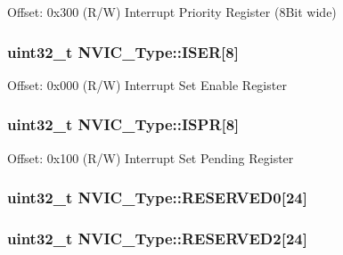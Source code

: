 Offset\-: 0x300 (R/\-W) Interrupt Priority Register (8\-Bit wide) \hypertarget{structNVIC__Type_af90c80b7c2b48e248780b3781e0df80f}{
\subsubsection[{I\-S\-E\-R}]{ uint32\-\_\-t N\-V\-I\-C\-\_\-\-Type\-::\-I\-S\-E\-R\mbox{[}8\mbox{]}}}\label{structNVIC__Type_af90c80b7c2b48e248780b3781e0df80f}
Offset\-: 0x000 (R/\-W) Interrupt Set Enable Register \hypertarget{structNVIC__Type_acf8e38fc2e97316242ddeb7ea959ab90}{
\subsubsection[{I\-S\-P\-R}]{ uint32\-\_\-t N\-V\-I\-C\-\_\-\-Type\-::\-I\-S\-P\-R\mbox{[}8\mbox{]}}}\label{structNVIC__Type_acf8e38fc2e97316242ddeb7ea959ab90}
Offset\-: 0x100 (R/\-W) Interrupt Set Pending Register \hypertarget{structNVIC__Type_a2de17698945ea49abd58a2d45bdc9c80}{
\subsubsection[{R\-E\-S\-E\-R\-V\-E\-D0}]{\setlength{\rightskip}{0pt plus 5cm}uint32\-\_\-t N\-V\-I\-C\-\_\-\-Type\-::\-R\-E\-S\-E\-R\-V\-E\-D0\mbox{[}24\mbox{]}}}\label{structNVIC__Type_a2de17698945ea49abd58a2d45bdc9c80}
\hypertarget{structNVIC__Type_a0953af43af8ec7fd5869a1d826ce5b72}{
\subsubsection[{R\-E\-S\-E\-R\-V\-E\-D2}]{\setlength{\rightskip}{0pt plus 5cm}uint32\-\_\-t N\-V\-I\-C\-\_\-\-Type\-::\-R\-E\-S\-E\-R\-V\-E\-D2\mbox{[}24\mbox{]}}}\label{structNVIC__Type_a0953af43af8ec7fd5869a1d826ce5b72}
